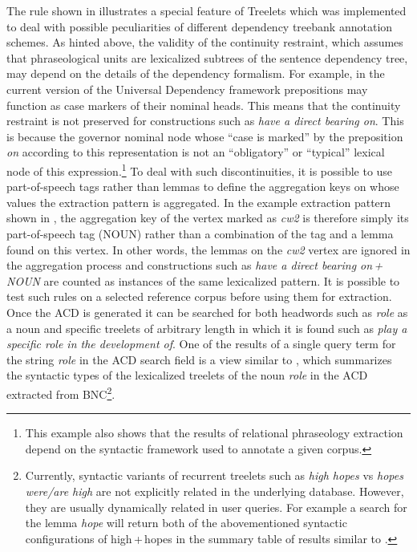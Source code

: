 \documentclass[output=paper]{langscibook}
\begin{document}
The rule shown in  illustrates a special feature of Treelets which was implemented to deal with possible peculiarities of different dependency treebank annotation schemes. As hinted above, the validity of the continuity restraint, which assumes that phraseological units are lexicalized subtrees of the sentence dependency tree, may depend on the details of the dependency formalism. For example, in the current version of the Universal Dependency framework prepositions may function as case markers of their nominal heads. This means that the continuity restraint is not preserved for constructions such as \textit{have a direct bearing on}. This is because the governor nominal node whose ``case is marked'' by the preposition \textit{on} according to this representation is not an ``obligatory'' or ``typical'' lexical node of this expression.\footnote{This example also shows that the results of relational phraseology extraction depend on the syntactic framework used to annotate a given corpus.} To deal with such discontinuities, it is possible to use part-of-speech tags rather than lemmas to define the aggregation keys on whose values the extraction pattern is aggregated. In the example extraction pattern shown in , the aggregation key of the vertex marked as \textit{cw2} is therefore simply its part-of-speech tag (NOUN) rather than a combination of the tag and a lemma found on this vertex. In other words, the lemmas on the \textit{cw2} vertex are ignored in the aggregation process and constructions such as \textit{have a direct bearing on\,+\,NOUN} are counted as instances of the same lexicalized pattern. It is possible to test such rules on a selected reference corpus before using them for extraction. Once the ACD is generated it can be searched for both headwords such as \textit{role} as a noun and specific treelets of arbitrary length in which it is found such as \textit{play a specific role in the development of}. One of the results of a single query term for the string \textit{role} in the ACD search field is a view similar to , which summarizes the syntactic types of the lexicalized treelets of the noun \textit{role} in the ACD extracted from BNC\footnote{\textrm{Currently, syntactic variants of recurrent treelets such as} \textrm{\textit{high hopes}} \textrm{vs} \textrm{\textit{hopes were/are high}} \textrm{are not explicitly related in the underlying database. However, they are usually dynamically related in user queries. For example a search for the lemma \textit{hope} will return both of the abovementioned syntactic configurations of high\,+\,hopes in the summary table of results similar to .}}. 
\end{document}
